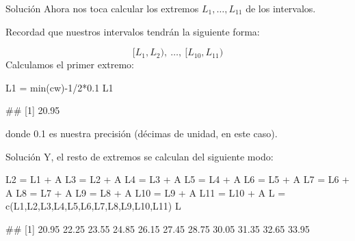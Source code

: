 \documentclass[
  ignorenonframetext,
  aspectratio=169]{beamer}
\newenvironment{Shaded}{\begin{snugshade}}{\end{snugshade}}
\newcommand{\DecValTok}[1]{\textcolor[rgb]{0.00,0.00,0.81}{#1}}
\newcommand{\FloatTok}[1]{\textcolor[rgb]{0.00,0.00,0.81}{#1}}
\newcommand{\FunctionTok}[1]{\textcolor[rgb]{0.00,0.00,0.00}{#1}}
\newcommand{\NormalTok}[1]{#1}
\newcommand{\OtherTok}[1]{\textcolor[rgb]{0.56,0.35,0.01}{#1}}
\newcommand{\SpecialCharTok}[1]{\textcolor[rgb]{0.00,0.00,0.00}{#1}}
\let\oldverbatim\verbatim
\let\endoldverbatim\endverbatim
\renewenvironment{verbatim}{\tiny\oldverbatim}{\endoldverbatim}
\begin{document}
\begin{frame}[fragile]{Solución}
\protect\hypertarget{soluciuxf3n-5}{}
Ahora nos toca calcular los extremos \(L_1,\dots,L_{11}\) de los
intervalos.

Recordad que nuestros intervalos tendrán la siguiente forma:

\[[L_1,L_2),\ \dots,\ [L_{10},L_{11})\] Calculamos el primer extremo:

\begin{Shaded}
\begin{Highlighting}[]
\NormalTok{L1 }\OtherTok{=} \FunctionTok{min}\NormalTok{(cw)}\SpecialCharTok{{-}}\DecValTok{1}\SpecialCharTok{/}\DecValTok{2}\SpecialCharTok{*}\FloatTok{0.1}
\NormalTok{L1}
\end{Highlighting}
\end{Shaded}

\begin{verbatim}
## [1] 20.95
\end{verbatim}

donde 0.1 es nuestra precisión (décimas de unidad, en este caso).
\end{frame}

\begin{frame}[fragile]{Solución}
\protect\hypertarget{soluciuxf3n-6}{}
Y, el resto de extremos se calculan del siguiente modo:

\begin{Shaded}
\begin{Highlighting}[]
\NormalTok{L2 }\OtherTok{=}\NormalTok{ L1 }\SpecialCharTok{+}\NormalTok{ A}
\NormalTok{L3 }\OtherTok{=}\NormalTok{ L2 }\SpecialCharTok{+}\NormalTok{ A}
\NormalTok{L4 }\OtherTok{=}\NormalTok{ L3 }\SpecialCharTok{+}\NormalTok{ A}
\NormalTok{L5 }\OtherTok{=}\NormalTok{ L4 }\SpecialCharTok{+}\NormalTok{ A}
\NormalTok{L6 }\OtherTok{=}\NormalTok{ L5 }\SpecialCharTok{+}\NormalTok{ A}
\NormalTok{L7 }\OtherTok{=}\NormalTok{ L6 }\SpecialCharTok{+}\NormalTok{ A}
\NormalTok{L8 }\OtherTok{=}\NormalTok{ L7 }\SpecialCharTok{+}\NormalTok{ A}
\NormalTok{L9 }\OtherTok{=}\NormalTok{ L8 }\SpecialCharTok{+}\NormalTok{ A}
\NormalTok{L10 }\OtherTok{=}\NormalTok{ L9 }\SpecialCharTok{+}\NormalTok{ A}
\NormalTok{L11 }\OtherTok{=}\NormalTok{ L10 }\SpecialCharTok{+}\NormalTok{ A}
\NormalTok{L }\OtherTok{=} \FunctionTok{c}\NormalTok{(L1,L2,L3,L4,L5,L6,L7,L8,L9,L10,L11)}
\NormalTok{L}
\end{Highlighting}
\end{Shaded}

\begin{verbatim}
##  [1] 20.95 22.25 23.55 24.85 26.15 27.45 28.75 30.05 31.35 32.65 33.95
\end{verbatim}
\end{frame}
\end{document}
